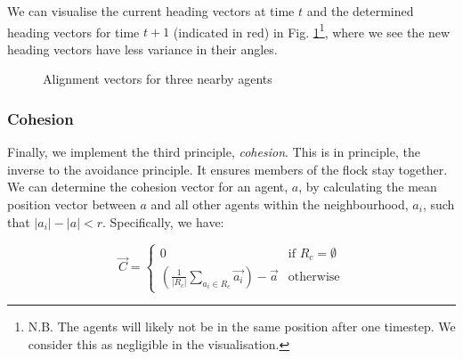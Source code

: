 \documentclass[12pt]{article}
\begin{document}
We can visualise the current heading vectors at time $t$ and the determined heading vectors for time $t+1$ (indicated in red) in Fig. \ref{fig:alignment-2d}\footnote{N.B. The agents will likely not be in the same position after one timestep. We consider this as negligible in the visualisation.}, where we see the new heading vectors have less variance in their angles.

\begin{figure}[ht]
    \centering
    \caption{Alignment vectors for three nearby agents}
    \label{fig:alignment-2d}
\end{figure}


\subsubsection{Cohesion}

Finally, we implement the third principle, \emph{cohesion}. This is in principle, the inverse to the avoidance principle. It ensures members of the flock stay together. We can determine the cohesion vector for an agent, $a$, by calculating the mean position vector between $a$ and all other agents within the neighbourhood, $a_i$, such that $|a_i| - |a| < r$. Specifically, we have:

\begin{equation}
\vec{C} =
\begin{cases}
    0 & \text{if } R_c = \emptyset \\
    \left(
    \frac{1}{|R_c|} \sum_{a_i \in R_c} \vec{a_i} \right) - \vec{a} & \text{otherwise}
\end{cases}
\end{equation}
\end{document}
